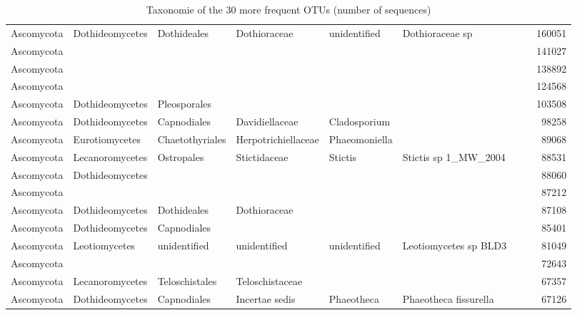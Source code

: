 \documentclass[12pt]{article}\usepackage[]{graphicx}\usepackage[]{color}
\numberwithin{figure}{section}
\begin{document}
\begin{landscape}
\begin{table}[ht]
\begin{tabular}{llllllllr}
  Ascomycota & Dothideomycetes & Dothideales & Dothioraceae & unidentified & Dothioraceae sp &  &  & 160051 \\ 
  Ascomycota &  &  &  &  &  &  &  & 141027 \\ 
  Ascomycota &  &  &  &  &  &  &  & 138892 \\ 
  Ascomycota &  &  &  &  &  &  &  & 124568 \\ 
  Ascomycota & Dothideomycetes & Pleosporales &  &  &  &  &  & 103508 \\ 
  Ascomycota & Dothideomycetes & Capnodiales & Davidiellaceae & Cladosporium &  &  &  & 98258 \\ 
  Ascomycota & Eurotiomycetes & Chaetothyriales & Herpotrichiellaceae & Phaeomoniella &  &  &  & 89068 \\ 
  Ascomycota & Lecanoromycetes & Ostropales & Stictidaceae & Stictis & Stictis sp 1\_MW\_2004 &  &  & 88531 \\ 
  Ascomycota & Dothideomycetes &  &  &  &  &  &  & 88060 \\ 
  Ascomycota &  &  &  &  &  &  &  & 87212 \\ 
  Ascomycota & Dothideomycetes & Dothideales & Dothioraceae &  &  &  &  & 87108 \\ 
  Ascomycota & Dothideomycetes & Capnodiales &  &  &  &  &  & 85401 \\ 
  Ascomycota & Leotiomycetes & unidentified & unidentified & unidentified & Leotiomycetes sp BLD3 &  &  & 81049 \\ 
  Ascomycota &  &  &  &  &  &  &  & 72643 \\ 
  Ascomycota & Lecanoromycetes & Teloschistales & Teloschistaceae &  &  &  &  & 67357 \\ 
  Ascomycota & Dothideomycetes & Capnodiales & Incertae sedis & Phaeotheca & Phaeotheca fissurella &  &  & 67126 \\ 
   \hline
\end{tabular}
\endgroup
\caption{Taxonomie of the 30 more
             frequent OTUs (number of sequences)} 
\end{table}

\end{landscape}
\end{document}

